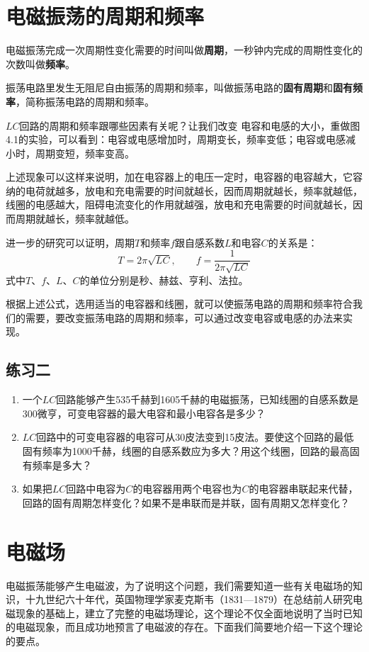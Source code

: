 \section{电磁振荡的周期和频率}
电磁振荡完成一次周期性变化需要的时间叫做\textbf{周期}，一秒钟内完成的周期性变化的次数叫做\textbf{频率}。

振荡电路里发生无阻尼自由振荡的周期和频率，叫做振荡电路的\textbf{固有周期}和\textbf{固有频率}，简称振荡电路的周期和频率。

$LC$回路的周期和频率跟哪些因素有关呢？让我们改变
电容和电感的大小，重做图4.1的实验，可以看到：电容或电感增加时，周期变长，频率变低；电容或电感减小时，周期变短，频率变高。

上述现象可以这样来说明，加在电容器上的电压一定时，电容器的电容越大，它容纳的电荷就越多，放电和充电需要的时间就越长，因而周期就越长，频率就越低，线圈的电感越大，阻碍电流变化的作用就越强，放电和充电需要的时间就越长，因而周期就越长，频率就越低。

进一步的研究可以证明，周期$T$和频率$f$跟自感系数$L$和电容$C$的关系是：
\[T=2\pi\sqrt{LC},\qquad f=\frac{1}{2\pi\sqrt{LC}} \]
式中$T$、$f$、$L$、$C$的单位分别是秒、赫兹、亨利、法拉。

根据上述公式，选用适当的电容器和线圈，就可以使振荡电路的周期和频率符合我们的需要，要改变振荡电路的周期和频率，可以通过改变电容或电感的办法来实现。

\subsection*{练习二}
\begin{enumerate}
	\item 一个$LC$回路能够产生535千赫到1605千赫的电磁振荡，已知线圈的自感系数是300微亨，可变电容器的最大电容和最小电容各是多少？
	\item $LC$回路中的可变电容器的电容可从30皮法变到15皮法。要使这个回路的最低固有频率为1000千赫，线圈的自感系数应为多大？用这个线圈，回路的最高固有频率是多大？
	\item 如果把$LC$回路中电容为$C$的电容器用两个电容也为$C$的电容器串联起来代替，回路的固有周期怎样变化？如果不是串联而是并联，固有周期又怎样变化？
\end{enumerate}


\section{电磁场}

电磁振荡能够产生电磁波，为了说明这个问题，我们需要知道一些有关电磁场的知识，十九世纪六十年代，英国物理学家麦克斯韦（1831—1879）在总结前人研究电磁现象的基础上，建立了完整的电磁场理论，这个理论不仅全面地说明了当时已知的电磁现象，而且成功地预言了电磁波的存在。下面我们简要地介绍一下这个理论的要点。

